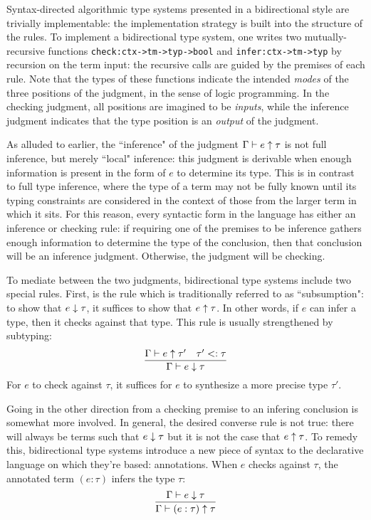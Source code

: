 Syntax-directed algorithmic type systems presented in a bidirectional style are trivially implementable: the implementation strategy is built into the structure of the rules. To implement a bidirectional type system, one writes two mutually-recursive functions \texttt{check:ctx->tm->typ->bool} and \texttt{infer:ctx->tm->typ} by recursion on the term input: the recursive calls are guided by the premises of each rule. Note that the types of these functions indicate the intended \textit{modes} of the three positions of the judgment, in the sense of logic programming. In the checking judgment, all positions are imagined to be \textit{inputs}, while the inference judgment indicates that the type position is an \textit{output} of the judgment.

As alluded to earlier, the ``inference" of the judgment $\Gamma \vdash e \uparrow \tau$ is not full inference, but merely ``local" inference: this judgment is derivable when enough information is present in the form of $e$ to determine its type. This is in contrast to full type inference, where the type of a term may not be fully known until its typing constraints are considered in the context of those from the larger term in which it sits. For this reason, every syntactic form in the language has either an inference or checking rule: if requiring one of the premises to be inference gathers enough information to determine the type of the conclusion, then that conclusion will be an inference judgment. Otherwise, the judgment will be checking.


To mediate between the two judgments, bidirectional type systems include two special rules. First, is the rule which is traditionally referred to as ``subsumption": to show that $e \downarrow \tau$, it suffices to show that $e \uparrow \tau$. In other words, if $e$ can infer a type, then it checks against that type. This rule is usually strengthened by subtyping:
$$
\infer{\Gamma \vdash e \checks \tau}{\Gamma \vdash e \infers \tau' & \tau' \subty \tau}
$$ For $e$ to check against $\tau$, it suffices for $e$ to synthesize a more precise type $\tau'$.

Going in the other direction from a checking premise to an infering conclusion is somewhat more involved. In general, the desired converse rule is not true: there will always be terms such that $e \downarrow \tau$ but it is not the case that $e \uparrow \tau$. To remedy this, bidirectional type systems introduce a new piece of syntax to the declarative language on which they're based: annotations. When $e$ checks against $\tau$, the annotated term $(e : \tau)$ infers the type $\tau$:
$$
\infer{\Gamma \vdash (e : \tau) \infers \tau}{\Gamma \vdash e \checks \tau}
$$

